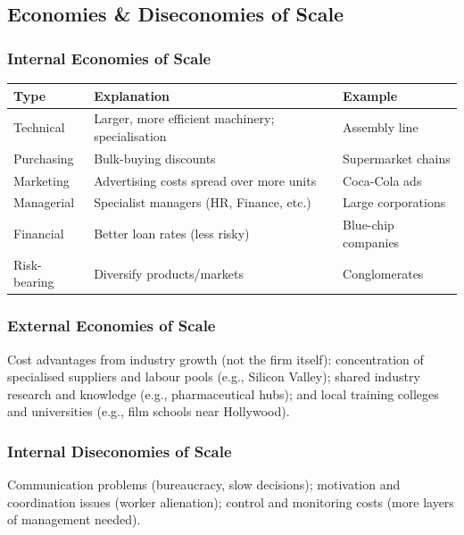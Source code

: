 \documentclass[11pt, a4paper, twoside]{book}
\begin{document}
\subsection{Economies \& Diseconomies of Scale}

\subsubsection{Internal Economies of Scale}

\begin{example}
\begin{tabular}{@{}lll@{}}
\textbf{Type} & \textbf{Explanation} & \textbf{Example} \\
\midrule
Technical & Larger, more efficient machinery; specialisation & Assembly line \\
Purchasing & Bulk-buying discounts & Supermarket chains \\
Marketing & Advertising costs spread over more units & Coca-Cola ads \\
Managerial & Specialist managers (HR, Finance, etc.) & Large corporations \\
Financial & Better loan rates (less risky) & Blue-chip companies \\
Risk-bearing & Diversify products/markets & Conglomerates \\
\end{tabular}
\end{example}

\subsubsection{External Economies of Scale}

Cost advantages from industry growth (not the firm itself): concentration of specialised suppliers and labour pools (e.g., Silicon Valley); shared industry research and knowledge (e.g., pharmaceutical hubs); and local training colleges and universities (e.g., film schools near Hollywood).

\subsubsection{Internal Diseconomies of Scale}

Communication problems (bureaucracy, slow decisions); motivation and coordination issues (worker alienation); control and monitoring costs (more layers of management needed).
\end{document}
